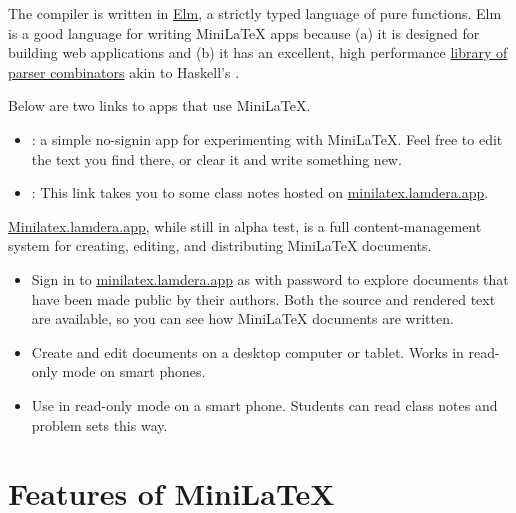 The compiler is written in \href{https://elm-lang.org}{Elm}, a strictly typed language of pure functions.  Elm is a good language for writing MiniLaTeX apps because (a) it is designed for building web applications and (b) it has an excellent, high performance  \href{https://package.elm-lang.org/packages/elm/parser/latest/}{library of parser combinators} akin to Haskell's .



Below are two links to  apps that use  MiniLaTeX.  

\begin{itemize}

\item {}: a simple no-signin app for experimenting with MiniLaTeX.  Feel free to edit the text you find there, or clear it and write something new.

\item {}:  This link takes you to some class notes
hosted on \href{https://minilatex.lamdera.app}{minilatex.lamdera.app}.

\end{itemize}

\href{https://minilatex.lamdera.app}{Minilatex.lamdera.app}, while still in alpha test, is a full content-management system for creating, editing, and distributing MiniLaTeX documents.

\begin{itemize}

\item {} Sign in to \href{https://minilatex.lamdera.app}{minilatex.lamdera.app}
as  with password  to explore documents that have been made public by their authors.  Both the source and rendered text are available, so you can see how MiniLaTeX documents are written. 

\item {} Create and edit documents on a desktop computer or tablet. Works in read-only mode on smart phones.

\item {} Use in read-only mode on a smart phone. Students can read class notes and problem sets this way.

\end{itemize}


\section{Features of MiniLaTeX}

